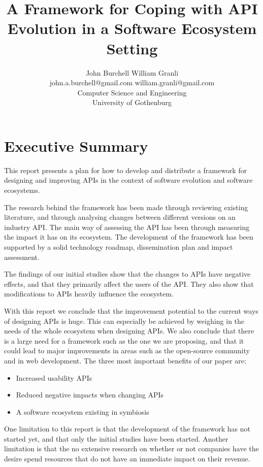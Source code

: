 \documentclass{article}
\title{A Framework for Coping with API Evolution in a Software Ecosystem Setting}
\begin{document}
\author{John Burchell \qquad William Granli \\
		john.a.burchell@gmail.com \qquad william.granli@gmail.com \\
		Computer Science and Engineering  \\
		University of Gothenburg }

\maketitle
\section{Executive Summary}
This report presents a plan for how to develop and distribute a framework for designing and improving APIs in the context of software evolution and software ecosystems. 

The research behind the framework has been made through reviewing existing literature, and through analysing changes between different versions on an industry API. The main way of assessing the API has been through measuring the impact it has on its ecosystem. The development of the framework has been supported by a solid technology roadmap, dissemination plan and impact assessment. 

The findings of our initial studies show that the changes to APIs have negative effects, and that they primarily affect the users of the API. They also show that modifications to APIs heavily influence the ecosystem. 

With this report we conclude that the improvement potential to the current ways of designing APIs is huge. This can especially be achieved by weighing in the needs of the whole ecosystem when designing APIs. We also conclude that there is a large need for a framework such as the one we are proposing, and that it could lead to major improvements in areas such as the open-source community and in web development. The three most important benefits of our paper are: 

\begin{itemize}
\item Increased usability APIs
\item Reduced negative impacts when changing APIs
\item A software ecosystem existing in symbiosis
\end{itemize}

One limitation to this report is that the development of the framework has not started yet, and that only the initial studies have been started. Another limitation is that the no extensive research on whether or not companies have the desire spend resources that do not have an immediate impact on their revenue. 
\end{document}
